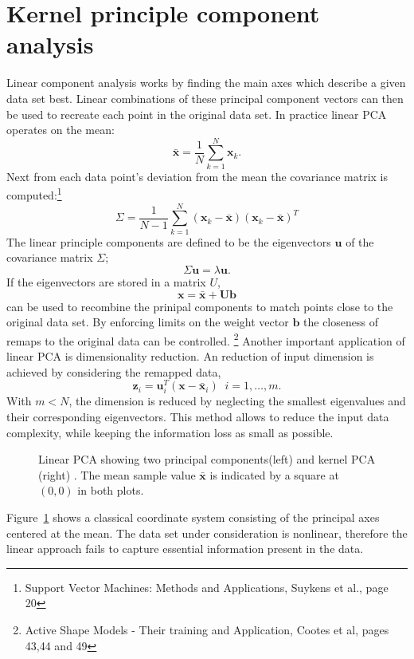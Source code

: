 \section{Kernel principle component analysis}
Linear component analysis works by finding the main axes which describe a given data set best. Linear combinations of these principal component vectors can then be used to recreate each point in the original data set. In practice linear PCA operates on the mean:
\begin{equation}
\bar{\mathbf{x}} = \frac{1}{N} \sum\limits_{k = 1}^{N} \mathbf{x}_k . 
\end{equation}
Next from each data point's deviation from the mean the covariance matrix is computed:\footnote{Support Vector Machines: Methods and Applications, Suykens et al., page 20}
\begin{equation}
\Sigma = \frac{1}{N - 1} \sum\limits_{k = 1}^{N} (\mathbf{x}_k - \bar{\mathbf{x}})(\mathbf{x}_k - \bar{\mathbf{x}})^T
\end{equation}
The linear principle components are defined to be the eigenvectors $\mathbf{u}$ of the covariance matrix $\Sigma$;
\begin{equation}
\Sigma \mathbf{u} = \lambda \mathbf{u}. 
\end{equation}
If the eigenvectors are stored in a matrix $U$,
\begin{equation}
\mathbf{x} = \bar{\mathbf{x}} + \mathbf{U}\mathbf{b}
\end{equation}
can be used to recombine the prinipal components to match points close to the original data set. By enforcing limits on the weight vector $\mathbf{b}$ the closeness of remaps to the original data can be controlled.  \footnote{Active Shape Models - Their training and Application, Cootes et al, pages 43,44 and 49}
Another important application of linear PCA is dimensionality reduction. An reduction of input dimension is achieved by considering the remapped data,
\begin{equation}
\mathbf{z}_i = \mathbf{u}_i^T (\mathbf{x} - \bar{\mathbf{x}}_i) \;\; i = 1,\dots,m.
\end{equation}
With $m < N$, the dimension is reduced by neglecting the smallest eigenvalues and their corresponding eigenvectors. This method allows to reduce the input data complexity, while keeping the information loss as small as possible. 
\begin{figure}
\centering


\caption{Linear PCA showing two principal components(left) and kernel PCA (right) .
		 The mean sample value $\bar{\mathbf{x}}$ is indicated by a square at $(0,0)$ in both plots.}
\label{fig:PCA}
\end{figure}
Figure~\ref{fig:PCA} shows a classical coordinate system consisting of the principal axes centered at the mean. The data set under consideration is nonlinear, therefore the linear approach fails to capture essential information present in the data. 

